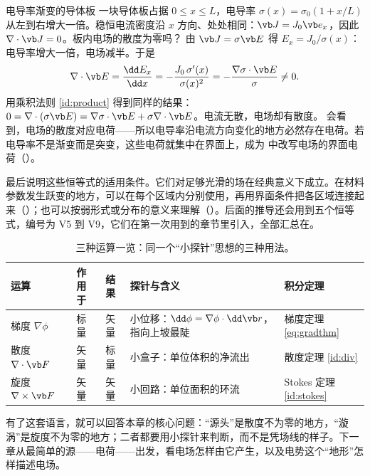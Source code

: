 \begin{example}{电导率渐变的导体板}\label{ex:calc-varsigma}
一块导体板占据 $0\le x\le L$，电导率 $\sigma(x)=\sigma_0(1+x/L)$ 从左到右增大一倍。稳恒电流密度沿 $x$ 方向、处处相同：$\vb J=J_0\vb e_x$，因此 $\nabla\cdot\vb J=0$。板内电场的散度为零吗？
\solution
由 $\vb J=\sigma\vb E$ 得 $E_x=J_0/\sigma(x)$：电导率增大一倍，电场减半。于是
\begin{equation*}
\nabla\cdot\vb E=\frac{\dd E_x}{\dd x}=-\frac{J_0\,\sigma'(x)}{\sigma(x)^2}=-\frac{\nabla\sigma\cdot\vb E}{\sigma}\neq0 .
\end{equation*}
用乘积法则 \eqref{id:product} 得到同样的结果：$0=\nabla\cdot(\sigma\vb E)=\nabla\sigma\cdot\vb E+\sigma\nabla\cdot\vb E$。电流无散，电场却有散度。 会看到，电场的散度对应电荷——所以电导率沿电流方向变化的地方必然存在电荷。若电导率不是渐变而是突变，这些电荷就集中在界面上，成为 中改写电场的界面电荷（）。
\end{example}

最后说明这些恒等式的适用条件。它们对足够光滑的场在经典意义下成立。在材料参数发生跃变的地方，可以在每个区域内分别使用，再用界面条件把各区域连接起来（）；也可以按弱形式或分布的意义来理解（）。后面的推导还会用到五个恒等式，编号为 V5 到 V9，它们在第一次用到的章节里引入，全部汇总在。

\begin{table}[htbp]\centering\small
\caption{三种运算一览：同一个“小探针”思想的三种用法。}\label{tab:calc-operators}
\begin{tabularx}{\linewidth}{@{}l l l Y Y@{}}
\toprule
运算 & 作用于 & 结果 & 探针与含义 & 积分定理\\\midrule
梯度 $\nabla\phi$ & 标量 & 矢量 & 小位移：$\dd\phi=\nabla\phi\cdot\dd\vb r$，指向上坡最陡 & 梯度定理 \eqref{eq:gradthm}\\
散度 $\nabla\cdot\vb F$ & 矢量 & 标量 & 小盒子：单位体积的净流出 & 散度定理 \eqref{id:div}\\
旋度 $\nabla\times\vb F$ & 矢量 & 矢量 & 小回路：单位面积的环流 & Stokes 定理 \eqref{id:stokes}\\
\bottomrule
\end{tabularx}
\end{table}

有了这套语言，就可以回答本章的核心问题：“源头”是散度不为零的地方，“漩涡”是旋度不为零的地方；二者都要用小探针来判断，而不是凭场线的样子。下一章从最简单的源——电荷——出发，看电场怎样由它产生，以及电势这个“地形”怎样描述电场。

